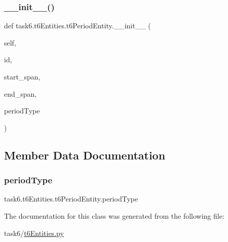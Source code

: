 \subsubsection{\texorpdfstring{\+\_\+\+\_\+init\+\_\+\+\_\+()}{\_\_init\_\_()}}
{\footnotesize\ttfamily def task6.\+t6\+Entities.\+t6\+Period\+Entity.\+\_\+\+\_\+init\+\_\+\+\_\+ (\begin{DoxyParamCaption}\item[{}]{self,  }\item[{}]{id,  }\item[{}]{start\+\_\+span,  }\item[{}]{end\+\_\+span,  }\item[{}]{period\+Type }\end{DoxyParamCaption})}



\subsection{Member Data Documentation}
\mbox{\label{classtask6_1_1t6Entities_1_1t6PeriodEntity_ae2f4d463fe5601083ce5ce3070690f1d}} 
\subsubsection{\texorpdfstring{period\+Type}{periodType}}
{\footnotesize\ttfamily task6.\+t6\+Entities.\+t6\+Period\+Entity.\+period\+Type}



The documentation for this class was generated from the following file\+:\begin{DoxyCompactItemize}
\item 
task6/\hyperlink{t6Entities_8py}{t6\+Entities.\+py}\end{DoxyCompactItemize}
